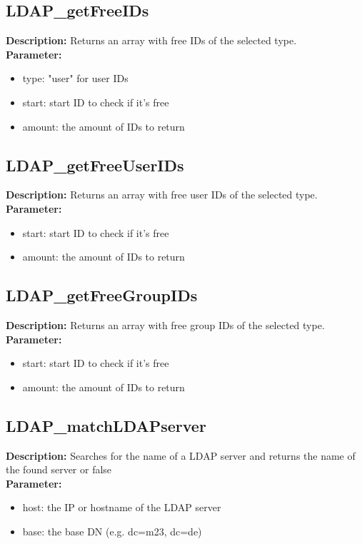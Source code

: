 \subsection{LDAP\_getFreeIDs}
\textbf{Description:} Returns an array with free IDs of the selected type.\\
\textbf{Parameter:}
\begin{itemize}
\item type: "user" for user IDs
\item start: start ID to check if it's free
\item amount: the amount of IDs to return
\end{itemize}

\subsection{LDAP\_getFreeUserIDs}
\textbf{Description:} Returns an array with free user IDs of the selected type.\\
\textbf{Parameter:}
\begin{itemize}
\item start: start ID to check if it's free
\item amount: the amount of IDs to return
\end{itemize}

\subsection{LDAP\_getFreeGroupIDs}
\textbf{Description:} Returns an array with free group IDs of the selected type.\\
\textbf{Parameter:}
\begin{itemize}
\item start: start ID to check if it's free
\item amount: the amount of IDs to return
\end{itemize}

\subsection{LDAP\_matchLDAPserver}
\textbf{Description:} Searches for the name of a LDAP server and returns the name of the found server or false\\
\textbf{Parameter:}
\begin{itemize}
\item host: the IP or hostname of the LDAP server
\item base: the base DN (e.g. dc=m23, dc=de)
\end{itemize}

